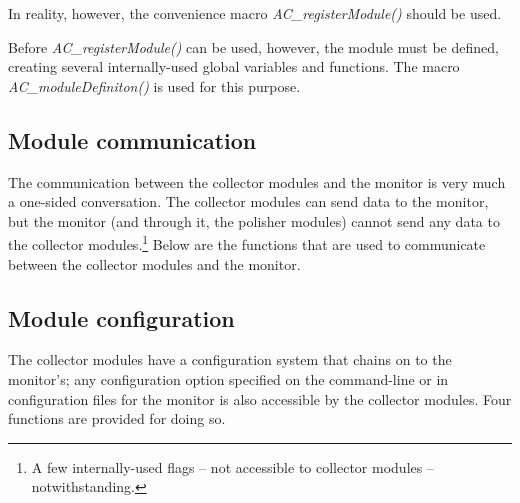 

In reality, however, the convenience macro \emph{AC\_registerModule()} should be used.


Before \emph{AC\_registerModule()} can be used, however, the module must be defined, creating several internally-used
global variables and functions. The macro \emph{AC\_moduleDefiniton()} is used for this purpose.


\subsection{Module communication}
The communication between the collector modules and the monitor is very much a one-sided conversation. The collector
modules can send data to the monitor, but the monitor (and through it, the polisher modules) cannot send any data to
the collector modules.\footnote{A few internally-used flags -- not accessible to collector modules -- notwithstanding.}
Below are the functions that are used to communicate between the collector modules and the monitor.


\subsection{Module configuration}
The collector modules have a configuration system that chains on to the monitor's; any configuration option specified
on the command-line or in configuration files for the monitor is also accessible by the collector modules. Four
functions are provided for doing so.

